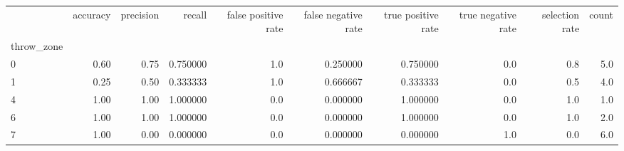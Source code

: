 \begin{tabular}{lrrrrrrrrr}
\toprule
{} &  accuracy &  precision &    recall &  false positive rate &  false negative rate &  true positive rate &  true negative rate &  selection rate &  count \\
throw\_zone &           &            &           &                      &                      &                     &                     &                 &        \\
\midrule
0          &      0.60 &       0.75 &  0.750000 &                  1.0 &             0.250000 &            0.750000 &                 0.0 &             0.8 &    5.0 \\
1          &      0.25 &       0.50 &  0.333333 &                  1.0 &             0.666667 &            0.333333 &                 0.0 &             0.5 &    4.0 \\
4          &      1.00 &       1.00 &  1.000000 &                  0.0 &             0.000000 &            1.000000 &                 0.0 &             1.0 &    1.0 \\
6          &      1.00 &       1.00 &  1.000000 &                  0.0 &             0.000000 &            1.000000 &                 0.0 &             1.0 &    2.0 \\
7          &      1.00 &       0.00 &  0.000000 &                  0.0 &             0.000000 &            0.000000 &                 1.0 &             0.0 &    6.0 \\
\bottomrule
\end{tabular}
